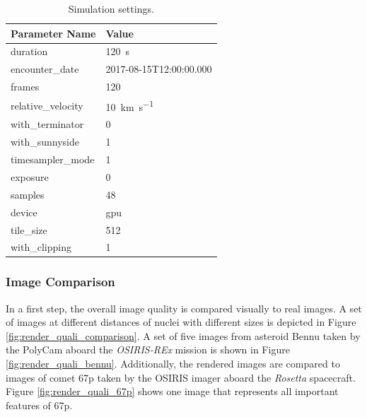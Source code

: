 \begin{table}[htb]
    \centering
    \caption{Simulation settings.}
    \label{tab:sim_settings}
    \begin{tabular}{l|l}
        \textbf{Parameter Name} & \textbf{Value} \\ \hline
        duration       & \SI{120}{\second}   \\
        encounter\_date & 2017-08-15T12:00:00.000\\
        frames       & \SI{120}{}     \\
        relative\_velocity     &  \SI{10}{\kilo\meter\per\second} \\
        with\_terminator  & \SI{0}{} \\
        with\_sunnyside & \SI{1}{} \\
        timesampler\_mode & \SI{1}{} \\
        exposure & \SI{0}{} \\
        samples & \SI{48}{} \\
        device & \gls{gpu} \\
        tile\_size & \SI{512}{} \\
        with\_clipping & \SI{1}{}
    \end{tabular}
\end{table}

\subsubsection{Image Comparison}
In a first step, the overall image quality is compared visually to real images. A set of images at different distances of nuclei with different sizes is depicted in Figure \ref{fig:render_quali_comparison}. A set of five images from asteroid Bennu taken by the PolyCam aboard the \textit{OSIRIS-REx} mission is shown in Figure \ref{fig:render_quali_bennu}. Additionally, the rendered images are compared to images of comet \gls{67p} taken by the OSIRIS imager aboard the \textit{Rosetta} spacecraft. Figure \ref{fig:render_quali_67p} shows one image that represents all important features of \gls{67p}.

